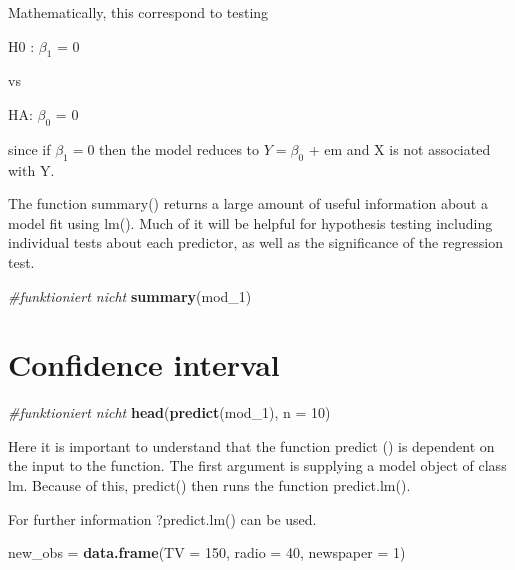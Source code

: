 \documentclass[]{report}
\newenvironment{Shaded}{\begin{snugshade}}{\end{snugshade}}
\newcommand{\KeywordTok}[1]{\textcolor[rgb]{0.13,0.29,0.53}{\textbf{#1}}}
\newcommand{\DataTypeTok}[1]{\textcolor[rgb]{0.13,0.29,0.53}{#1}}
\newcommand{\DecValTok}[1]{\textcolor[rgb]{0.00,0.00,0.81}{#1}}
\newcommand{\StringTok}[1]{\textcolor[rgb]{0.31,0.60,0.02}{#1}}
\newcommand{\CommentTok}[1]{\textcolor[rgb]{0.56,0.35,0.01}{\textit{#1}}}
\newcommand{\NormalTok}[1]{#1}
\begin{document}
Mathematically, this correspond to testing

H0 : \(\beta_1\) = 0

vs

HA: \(\beta_0\) = 0

since if \(\beta_1=0\) then the model reduces to \(Y=\beta_0\) + em and
X is not associated with Y.

The function summary() returns a large amount of useful information
about a model fit using lm(). Much of it will be helpful for hypothesis
testing including individual tests about each predictor, as well as the
significance of the regression test.

\begin{Shaded}
\begin{Highlighting}[]
\CommentTok{#funktioniert nicht}
\KeywordTok{summary}\NormalTok{(mod_}\DecValTok{1}\NormalTok{)}
\end{Highlighting}
\end{Shaded}

\section{Confidence interval}\label{confidence-interval}

\begin{Shaded}
\begin{Highlighting}[]
\CommentTok{#funktioniert nicht}
\KeywordTok{head}\NormalTok{(}\KeywordTok{predict}\NormalTok{(mod_}\DecValTok{1}\NormalTok{), }\DataTypeTok{n =} \DecValTok{10}\NormalTok{)}
\end{Highlighting}
\end{Shaded}

Here it is important to understand that the function predict () is
dependent on the input to the function. The first argument is supplying
a model object of class lm. Because of this, predict() then runs the
function predict.lm().

For further information ?predict.lm() can be used.

\begin{Shaded}
\begin{Highlighting}[]
\NormalTok{new_obs =}\StringTok{ }\KeywordTok{data.frame}\NormalTok{(}\DataTypeTok{TV =} \DecValTok{150}\NormalTok{, }\DataTypeTok{radio =} \DecValTok{40}\NormalTok{, }\DataTypeTok{newspaper =} \DecValTok{1}\NormalTok{)}
\end{Highlighting}
\end{Shaded}
\end{document}
